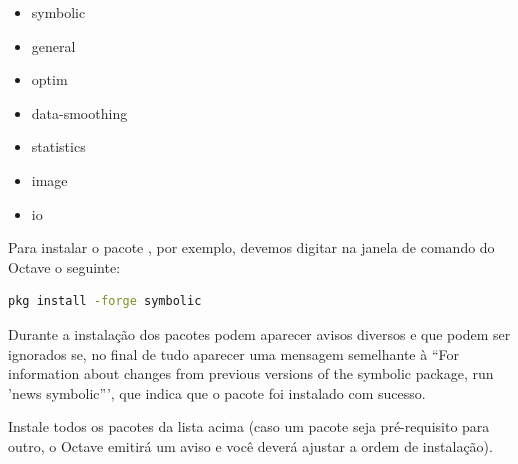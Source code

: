 \begin{itemize}[noitemsep]
\item symbolic
\item general
\item optim
\item data-smoothing
\item statistics
\item image
\item io
\end{itemize}

Para instalar o pacote , por exemplo, devemos digitar na
janela de comando do Octave o seguinte:
\begin{tcolorbox}
\begin{lstlisting}[language=bash]
pkg install -forge symbolic
\end{lstlisting}
\end{tcolorbox}

Durante a instalação dos pacotes podem aparecer avisos diversos e 
que podem ser ignorados se, no final de tudo aparecer uma mensagem semelhante
à ``For information about changes from previous versions of the symbolic package,
run 'news symbolic''', que indica que o pacote foi instalado com sucesso.

Instale todos os pacotes da lista acima (caso um pacote seja pré-requisito para
outro, o Octave emitirá um aviso e você deverá ajustar a ordem de instalação).
